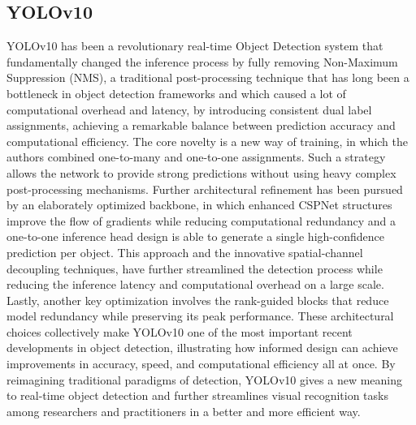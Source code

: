 \subsection{YOLOv10}
YOLOv10 has been a revolutionary real-time Object Detection system that fundamentally changed the inference process by fully removing Non-Maximum Suppression (NMS), a traditional post-processing technique that has long been a bottleneck in object detection frameworks and which caused a lot of computational overhead and latency, by introducing consistent dual label assignments, achieving a remarkable balance between prediction accuracy and computational efficiency.
The core novelty is a new way of training, in which the authors combined one-to-many and one-to-one assignments. Such a strategy allows the network to provide strong predictions without using heavy complex post-processing mechanisms. Further architectural refinement has been pursued by an elaborately optimized backbone, in which enhanced CSPNet structures improve the flow of gradients while reducing computational redundancy and a one-to-one inference head design is able to generate a single high-confidence prediction per object. This approach and the innovative spatial-channel decoupling techniques, have further streamlined the detection process while reducing the inference latency and computational overhead on a large scale.
Lastly, another key optimization involves the rank-guided blocks that reduce model redundancy while preserving its peak performance. These architectural choices collectively make YOLOv10 one of the most important recent developments in object detection, illustrating how informed design can achieve improvements in accuracy, speed, and computational efficiency all at once.
By reimagining traditional paradigms of detection, YOLOv10 gives a new meaning to real-time object detection and further streamlines visual recognition tasks among researchers and practitioners in a better and more efficient way.

